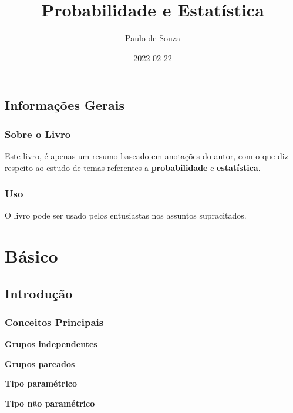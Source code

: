 \documentclass[
]{book}
\title{Probabilidade e Estatística}
\author{Paulo de Souza}
\date{2022-02-22}
\begin{document}
\maketitle

{
\setcounter{tocdepth}{1}
\tableofcontents
}
\hypertarget{informauxe7uxf5es-gerais}{%
\chapter*{Informações Gerais}\label{informauxe7uxf5es-gerais}}

\hypertarget{sobre-o-livro}{%
\section*{Sobre o Livro}\label{sobre-o-livro}}

Este livro, é apenas um resumo baseado em anotações do autor, com o que diz respeito ao estudo de temas referentes a \textbf{probabilidade} e \textbf{estatística}.

\hypertarget{uso}{%
\section*{Uso}\label{uso}}

O livro pode ser usado pelos entusiastas nos assuntos supracitados.

\hypertarget{part-buxe1sico}{%
\part{Básico}\label{part-buxe1sico}}

\hypertarget{introduuxe7uxe3o}{%
\chapter{Introdução}\label{introduuxe7uxe3o}}

\hypertarget{conceitos-principais}{%
\section{Conceitos Principais}\label{conceitos-principais}}

\textbf{Grupos independentes}

\textbf{Grupos pareados}

\textbf{Tipo paramétrico}

\textbf{Tipo não paramétrico}
\end{document}
